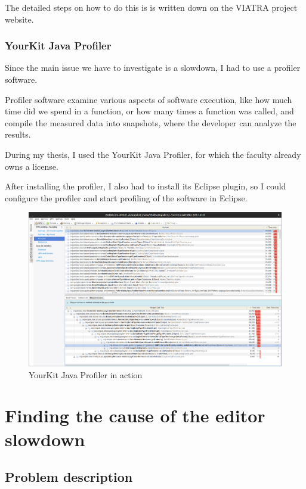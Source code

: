 \documentclass[11pt,a4paper,oneside]{report}
\begin{document}
The detailed steps on how to do this is is written down on the VIATRA project
website.

\subsection{YourKit Java Profiler}
Since the main issue we have to investigate is a slowdown, I had to use a
profiler software.

Profiler software examine various aspects of software execution, like how much
time did we spend in a function, or how many times a function was called, and
compile the measured data into snapshots, where the developer can analyze the
results.

During my thesis, I used the YourKit Java Profiler, for which the faculty
already owns a license.

After installing the profiler, I also had to install its Eclipse plugin, so I
could configure the profiler and start profiling of the software in Eclipse.

\begin{figure}[ht]
\centering
\includegraphics[width=150mm, keepaspectratio]{figures/yourkit-profiler.png}
\caption{YourKit Java Profiler in action}
\label{fig:yourkit-profiler}
\end{figure}

\chapter{Finding the cause of the editor slowdown}
\section{Problem description}
\end{document}

